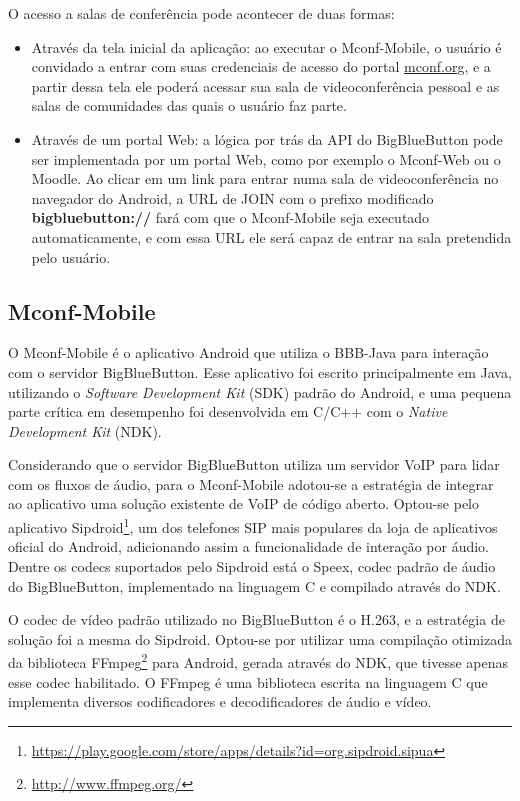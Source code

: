 \documentclass{acm_proc_article-sp}
\begin{document}
O acesso a salas de conferência pode acontecer de duas formas:
\begin{itemize}
 \item Através da tela inicial da aplicação: ao executar o Mconf-Mobile, o usuário é convidado a entrar com suas credenciais de acesso do portal \url{mconf.org}, e a partir dessa tela ele poderá acessar sua sala de videoconferência pessoal e as salas de comunidades das quais o usuário faz parte.
 \item Através de um portal Web: a lógica por trás da API do BigBlueButton pode ser implementada por um portal Web, como por exemplo o Mconf-Web ou o Moodle. Ao clicar em um link para entrar numa sala de videoconferência no navegador do Android, a URL de JOIN com o prefixo modificado \textbf{bigbluebutton://} fará com que o Mconf-Mobile seja executado automaticamente, e com essa URL ele será capaz de entrar na sala pretendida pelo usuário.
\end{itemize}

\subsection{Mconf-Mobile}\label{subsec:bbb-android}

O Mconf-Mobile é o aplicativo Android que utiliza o BBB-Java para interação com o servidor BigBlueButton. Esse aplicativo foi escrito principalmente em Java, utilizando o \emph{Software Development Kit} (SDK) padrão do Android, e uma pequena parte crítica em desempenho foi desenvolvida em C/C++ com o \emph{Native Development Kit} (NDK).

Considerando que o servidor BigBlueButton utiliza um servidor VoIP para lidar com os fluxos de áudio, para o Mconf-Mobile adotou-se a estratégia de integrar ao aplicativo uma solução existente de VoIP de código aberto. Optou-se pelo aplicativo Sipdroid\footnote{\url{https://play.google.com/store/apps/details?id=org.sipdroid.sipua}}, um dos telefones SIP mais populares da loja de aplicativos oficial do Android, adicionando assim a funcionalidade de interação por áudio. Dentre os codecs suportados pelo Sipdroid está o Speex, codec padrão de áudio do BigBlueButton, implementado na linguagem C e compilado através do NDK.

O codec de vídeo padrão utilizado no BigBlueButton é o H.263, e a estratégia de solução foi a mesma do Sipdroid. Optou-se por utilizar uma compilação otimizada da biblioteca FFmpeg\footnote{\url{http://www.ffmpeg.org/}} para Android, gerada através do NDK, que tivesse apenas esse codec habilitado. O FFmpeg é uma biblioteca escrita na linguagem C que implementa diversos codificadores e decodificadores de áudio e vídeo.
\end{document}
